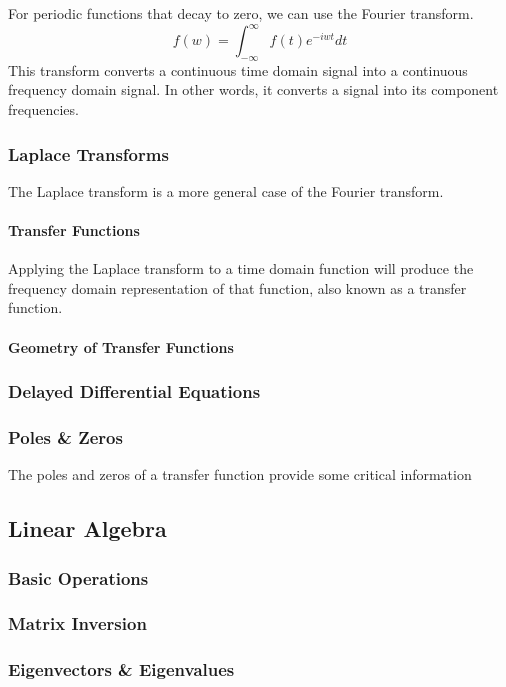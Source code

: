 \documentclass[../notes.tex]{subfiles}
\begin{document}
For periodic functions that decay to zero, we can use the Fourier transform.
\begin{equation}
    f(w) = \int_{-\infty}^{\infty}f(t)e^{-iwt}dt
\end{equation}
This transform converts a continuous time domain signal into a continuous frequency domain signal. In other words, it converts a signal into its component frequencies.

\subsubsection{Laplace Transforms}
The Laplace transform is a more general case of the Fourier transform.

\paragraph{Transfer Functions}
Applying the Laplace transform to a time domain function will produce the frequency domain representation of that function, also known as a transfer function.

\paragraph{Geometry of Transfer Functions}

\subsubsection{Delayed Differential Equations}

\subsubsection{Poles \& Zeros}
The poles and zeros of a transfer function provide some critical information

\subsection{Linear Algebra}
\subsubsection{Basic Operations}
\subsubsection{Matrix Inversion}
\subsubsection{Eigenvectors \& Eigenvalues} \label{sec:eig}
\end{document}
